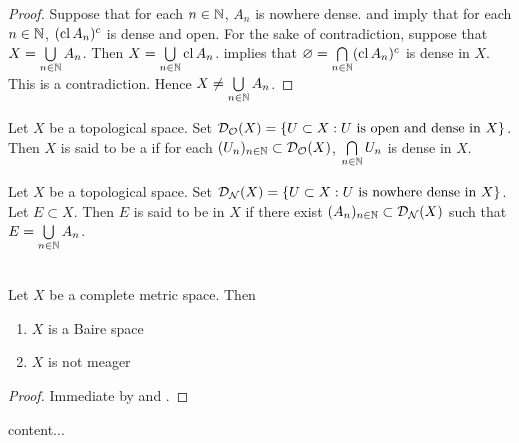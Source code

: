 \documentclass{book}
\begin{document}
\begin{proof}
	Suppose that for each $n \in \mathbb{N}$, $A_n$ is nowhere dense.  and  imply that for each $n \in \mathbb{N}$, $(\operatorname{cl} A_n)^c$ is dense and open. For the sake of contradiction, suppose that $X = \bigcup\limits_{n \in \mathbb{N}} A_n$. Then $X = \bigcup\limits_{n \in \mathbb{N}} \operatorname{cl} A_n$.  implies that  $\varnothing = \bigcap\limits_{n \in \mathbb{N}} (\operatorname{cl} A_n)^c$ is dense in $X$. This is a contradiction. Hence $X \neq \bigcup\limits_{n \in \mathbb{N}} A_n$. 
\end{proof}

\begin{defn} 
	Let $X$ be a topological space. Set $\mathcal{D}_{\mathcal{O}}(X) = \{U \subset X: U \text{ is open and dense in $X$}\}$. Then $X$ is said to be a  if for each $(U_n)_{n \in \mathbb{N}} \subset \mathcal{D}_{\mathcal{O}}(X)$, $\bigcap\limits_{n \in \mathbb{N}} U_n$ is dense in $X$. \\
\end{defn}

\begin{defn} 
	Let $X$ be a topological space. Set $\mathcal{D}_{\mathcal{N}}(X) = \{U \subset X: U \text{ is nowhere dense in $X$}\}$. Let $E \subset X$. Then $E$ is said to be  in $X$ if there exist $(A_n)_{n \in \mathbb{N}} \subset \mathcal{D}_{\mathcal{N}}(X)$ such that $E = \bigcup\limits_{n \in \mathbb{N}} A_n$.
\end{defn}

\begin{thm}  \\
	Let $X$ be a complete metric space. Then 
	\begin{enumerate}
		\item $X$ is a Baire space
		\item $X$ is not meager
	\end{enumerate} 
\end{thm}

\begin{proof}
	Immediate by  and .
\end{proof}

\begin{defn}
	content...
\end{defn}
\end{document}
